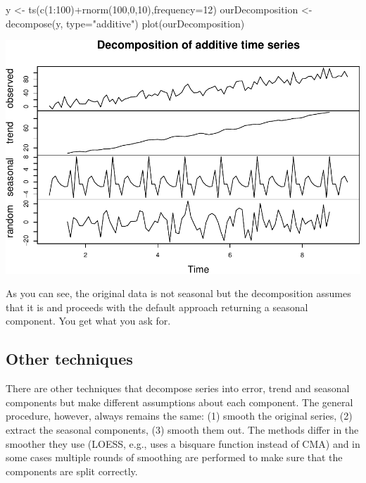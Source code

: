 \documentclass[
]{book}
\newenvironment{Shaded}{\begin{snugshade}}{\end{snugshade}}
\newcommand{\AttributeTok}[1]{\textcolor[rgb]{0.77,0.63,0.00}{#1}}
\newcommand{\DecValTok}[1]{\textcolor[rgb]{0.00,0.00,0.81}{#1}}
\newcommand{\FunctionTok}[1]{\textcolor[rgb]{0.00,0.00,0.00}{#1}}
\newcommand{\NormalTok}[1]{#1}
\newcommand{\OtherTok}[1]{\textcolor[rgb]{0.56,0.35,0.01}{#1}}
\newcommand{\SpecialCharTok}[1]{\textcolor[rgb]{0.00,0.00,0.00}{#1}}
\newcommand{\StringTok}[1]{\textcolor[rgb]{0.31,0.60,0.02}{#1}}
\theoremstyle{definition}
\theoremstyle{definition}
\theoremstyle{definition}
\theoremstyle{definition}
\theoremstyle{remark}
\begin{document}
\begin{Shaded}
\begin{Highlighting}[]
\NormalTok{y }\OtherTok{\textless{}{-}} \FunctionTok{ts}\NormalTok{(}\FunctionTok{c}\NormalTok{(}\DecValTok{1}\SpecialCharTok{:}\DecValTok{100}\NormalTok{)}\SpecialCharTok{+}\FunctionTok{rnorm}\NormalTok{(}\DecValTok{100}\NormalTok{,}\DecValTok{0}\NormalTok{,}\DecValTok{10}\NormalTok{),}\AttributeTok{frequency=}\DecValTok{12}\NormalTok{)}
\NormalTok{ourDecomposition }\OtherTok{\textless{}{-}} \FunctionTok{decompose}\NormalTok{(y, }\AttributeTok{type=}\StringTok{"additive"}\NormalTok{)}
\FunctionTok{plot}\NormalTok{(ourDecomposition)}
\end{Highlighting}
\end{Shaded}

\includegraphics{adam_files/figure-latex/decomposeRandomNoise-1.pdf}

As you can see, the original data is not seasonal but the decomposition assumes that it is and proceeds with the default approach returning a seasonal component. You get what you ask for.

\hypertarget{other-techniques}{%
\subsection{Other techniques}\label{other-techniques}}

There are other techniques that decompose series into error, trend and seasonal components but make different assumptions about each component. The general procedure, however, always remains the same: (1) smooth the original series, (2) extract the seasonal components, (3) smooth them out. The methods differ in the smoother they use (LOESS, e.g., uses a bisquare function instead of CMA) and in some cases multiple rounds of smoothing are performed to make sure that the components are split correctly.
\end{document}
